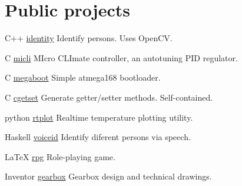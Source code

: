 \documentclass{tccv}
\begin{document}
\section{Public projects}
\begin{yearlist}
\item{C++}
     {\href{https://github.com/MiroslavVitkov/identity}{identity}}
     {Identify persons. Uses OpenCV.}

\item{C}
     {\href{https://github.com/MiroslavVitkov/micli}{micli}}
     {MIcro CLImate controller, an autotuning PID regulator.}

\item{C}
     {\href{https://github.com/MiroslavVitkov/megaboot}{megaboot}}
     {Simple atmega168 bootloader.}

\item{C}
     {\href{https://github.com/MiroslavVitkov/cgetset}{cgetset}}
     {Generate getter/setter methods. Self-contained.}

\item{python}
     {\href{https://github.com/MiroslavVitkov/rtplot}{rtplot}}
     {Realtime temperature plotting utility.}

\item{Haskell}
     {\href{https://github.com/MiroslavVitkov/voiceid}{voiceid}}
     {Identify diferent persons via speech.}

\item{LaTeX}
     {\href{https://github.com/MiroslavVitkov/rpg}{rpg}}
     {Role-playing game.}

\item{Inventor}
     {\href{https://github.com/MiroslavVitkov/gearbox}{gearbox}}
     {Gearbox design and technical drawings.}
\end{yearlist}


\pagebreak
\end{document}
